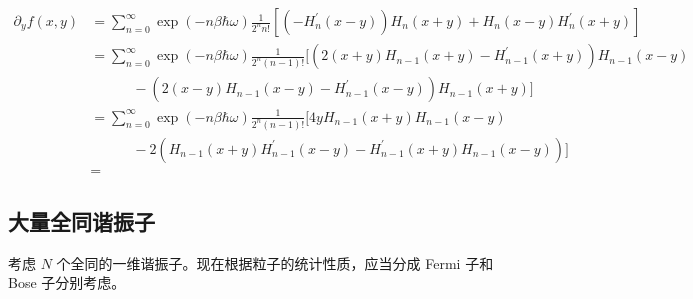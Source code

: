\begin{linenomath}
    \begin{align}
        \partial_y f(x,y)&=\sum_{n=0}^{\infty} \exp(-n\beta \hbar\omega)\frac{1}{2^n n!} \left[ \left( -H_n^\prime (x-y) \right) H_n(x+y) + H_n(x-y)H_n^\prime(x+y) \right] \\
        &=\sum_{n=0}^{\infty} \exp(-n\beta \hbar\omega)\frac{1}{2^n \left( n-1 \right)!} [ \left( 2\left( x+y \right) H_{n-1}\left( x+y \right) - H_{n-1}^{\prime}\left( x+y \right) \right) H_{n-1}\left( x-y \right) \\  &\quad\quad\quad  -\left( 2\left( x-y \right) H_{n-1}\left( x-y \right) - H_{n-1}^{\prime}\left( x-y \right) \right) H_{n-1}(x+y)]\\
        &=\sum_{n=0}^{\infty} \exp(-n\beta \hbar\omega)\frac{1}{2^n \left( n-1 \right)!} [ 4y H_{n-1}\left( x+y \right) H_{n-1}\left( x-y \right) \\  &\quad\quad\quad - 2(H_{n-1}\left( x+y \right) H_{n-1}^{\prime}\left( x-y \right)  - H_{n-1}^{\prime}\left( x+y \right) H_{n-1}\left( x-y \right)) ] \\
        &=
    \end{align}
\end{linenomath}
\subsection{大量全同谐振子}
考虑 $N$ 个全同的一维谐振子。现在根据粒子的统计性质，应当分成 Fermi 子和 Bose 子分别考虑。









